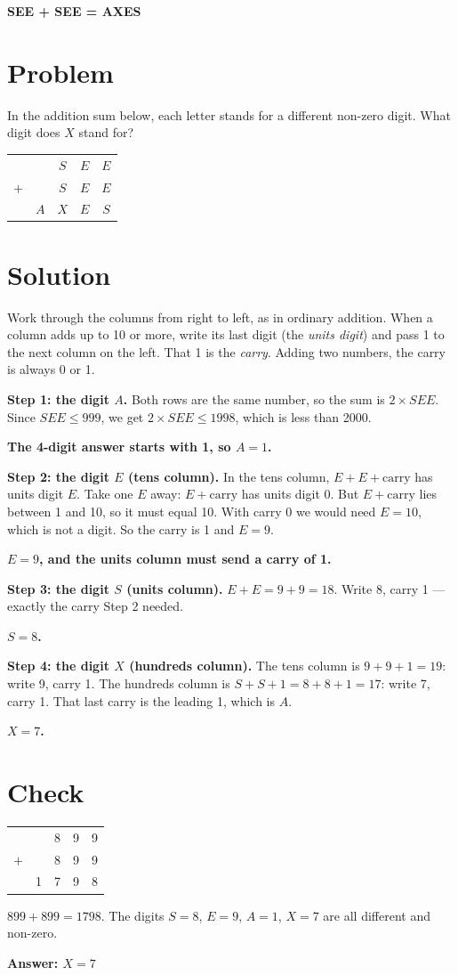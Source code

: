 \documentclass[11pt,a4paper]{article}
\makeatletter
\newcommand{\colsum}[3]{%
\begin{center}\large
\renewcommand{\arraystretch}{1.3}
\begin{tabular}{c@{\hspace{1.2em}}c@{\hspace{1.2em}}c@{\hspace{1.2em}}c@{\hspace{1.2em}}c}
#1\\
#2\\ \midrule
#3
\end{tabular}
\end{center}}
\makeatother
\begin{document}
\begin{center}{\Large\bfseries SEE + SEE = AXES}\end{center}

\section*{Problem}

In the addition sum below, each letter stands for a different non-zero digit. What digit does $X$ stand for?

\colsum{ & & $S$ & $E$ & $E$}{$+$ & & $S$ & $E$ & $E$}{ & $A$ & $X$ & $E$ & $S$}

\section*{Solution}

Work through the columns from right to left, as in ordinary addition. When a column adds up to 10 or more, write its last digit (the \emph{units digit}) and pass 1 to the next column on the left. That 1 is the \emph{carry}. Adding two numbers, the carry is always 0 or 1.

\textbf{\boldmath Step 1: the digit $A$.} Both rows are the same number, so the sum is $2 \times SEE$. Since $SEE \le 999$, we get $2 \times SEE \le 1998$, which is less than 2000.

\textbf{\boldmath The 4-digit answer starts with 1, so $A = 1$.}

\textbf{\boldmath Step 2: the digit $E$ (tens column).} In the tens column, $E + E + \text{carry}$ has units digit $E$. Take one $E$ away: $E + \text{carry}$ has units digit 0. But $E + \text{carry}$ lies between 1 and 10, so it must equal 10. With carry 0 we would need $E = 10$, which is not a digit. So the carry is 1 and $E = 9$.

\textbf{\boldmath $E = 9$, and the units column must send a carry of 1.}

\textbf{\boldmath Step 3: the digit $S$ (units column).} $E + E = 9 + 9 = 18$. Write 8, carry 1 --- exactly the carry Step 2 needed.

\textbf{\boldmath $S = 8$.}

\textbf{\boldmath Step 4: the digit $X$ (hundreds column).} The tens column is $9 + 9 + 1 = 19$: write 9, carry 1. The hundreds column is $S + S + 1 = 8 + 8 + 1 = 17$: write 7, carry 1. That last carry is the leading 1, which is $A$.

\textbf{\boldmath $X = 7$.}

\section*{Check}

\colsum{ & & 8 & 9 & 9}{$+$ & & 8 & 9 & 9}{ & 1 & 7 & 9 & 8}

$899 + 899 = 1798$. The digits $S = 8$, $E = 9$, $A = 1$, $X = 7$ are all different and non-zero.

\begin{center}\textbf{\boldmath Answer: $X = 7$}\end{center}
\end{document}
